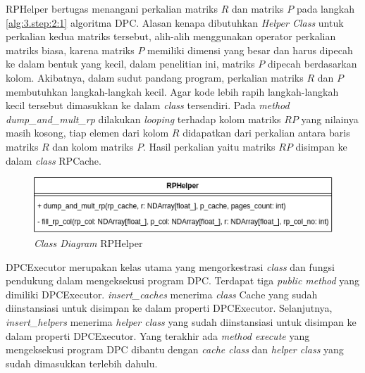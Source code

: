 RPHelper bertugas menangani perkalian matriks $R$ dan matriks $P$ pada langkah \ref{alg:3.step:2:1} algoritma DPC. Alasan kenapa dibutuhkan \textit{Helper Class} untuk perkalian kedua matriks tersebut, alih-alih menggunakan operator perkalian matriks biasa, karena matriks $P$ memiliki dimensi yang besar dan harus dipecah ke dalam bentuk yang kecil, dalam penelitian ini, matriks $P$ dipecah berdasarkan kolom. Akibatnya, dalam sudut pandang program, perkalian matriks $R$ dan $P$ membutuhkan langkah-langkah kecil. Agar kode lebih rapih langkah-langkah kecil tersebut dimasukkan ke dalam \textit{class} tersendiri. Pada \textit{method} \textit{dump\_and\_mult\_rp} dilakukan \textit{looping} terhadap kolom matriks $RP$ yang nilainya masih kosong, tiap elemen dari kolom $R$ didapatkan dari perkalian antara baris matriks $R$ dan kolom matriks $P$. Hasil perkalian yaitu matriks $RP$ disimpan ke dalam \textit{class} RPCache.

\begin{figure}[H]
	\centering
	\includegraphics[keepaspectratio, width={\textwidth}]{gambar/rp_helper_class_diagram}
	\caption{\textit{Class Diagram} RPHelper}
	\label{gambar:rp_helper_class_diagram}
\end{figure}	

DPCExecutor merupakan kelas utama yang mengorkestrasi \textit{class} dan fungsi pendukung dalam mengeksekusi program DPC. Terdapat tiga \textit{public method} yang dimiliki DPCExecutor. \textit{insert\_caches} menerima \textit{class} Cache yang sudah diinstansiasi untuk disimpan ke dalam properti DPCExecutor. Selanjutnya, \textit{insert\_helpers} menerima \textit{helper class} yang sudah diinstansiasi untuk disimpan ke dalam properti DPCExecutor. Yang terakhir ada \textit{method execute} yang mengeksekusi program DPC dibantu dengan \textit{cache class} dan \textit{helper class} yang sudah dimasukkan terlebih dahulu.

